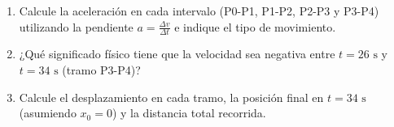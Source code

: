 \documentclass[11pt, letterpaper]{article}
\newif\ifmostrarrespuestas
\newcommand{\respuesta}[1]{
	\ifmostrarrespuestas
	\par\vspace{0.2cm}
	\begin{tcolorbox}[colback=blue!5!white, colframe=valblue, coltext=blue!80!black, boxrule=0.5pt, arc=1mm, left=2mm, right=2mm, top=1.5mm, bottom=1.5mm]
		\footnotesize \textbf{\textcolor{valblue}{Solución Paso a Paso (Docente):}} #1
	\end{tcolorbox}
	\vspace{0.2cm}
	\fi
}
\begin{document}
\begin{enumerate}[leftmargin=*, itemsep=0.6cm]
		\begin{enumerate}[label=\alph*., itemsep=0.2cm]
			\item Calcule la aceleración en cada intervalo (P0-P1, P1-P2, P2-P3 y P3-P4) utilizando la pendiente $a = \frac{\Delta v}{\Delta t}$ e indique el tipo de movimiento.
			\item ¿Qué significado físico tiene que la velocidad sea negativa entre $t = 26\text{ s}$ y $t = 34\text{ s}$ (tramo P3-P4)?
			\item Calcule el desplazamiento en cada tramo, la posición final en $t = 34\text{ s}$ (asumiendo $x_0 = 0$) y la distancia total recorrida.
		\end{enumerate}
		\respuesta{
			\textbf{a)} \textbf{P0-P1 ($0-8\text{ s}$):} $a_{01} = \frac{35-15}{8-0} = \mathbf{2,5}\text{ \textbf{m/s}}^\mathbf{2}$ ($\text{MUA}+$); \quad 
			\textbf{P1-P2 ($8-20\text{ s}$):} $a_{12} = \frac{35-35}{12} = \mathbf{0}\text{ \textbf{m/s}}^\mathbf{2}$ ($\text{MU}$);\\
			\textbf{P2-P3 ($20-26\text{ s}$):} $a_{23} = \frac{0-35}{6} \approx \mathbf{-5,83}\text{ \textbf{m/s}}^\mathbf{2}$ ($\text{MUA}-$); \quad 
			\textbf{P3-P4 ($26-34\text{ s}$):} $a_{34} = \frac{-20-0}{8} = \mathbf{-2,5}\text{ \textbf{m/s}}^\mathbf{2}$ ($\text{MUA}$ reversa).\\[0.1cm]
			\textbf{b)} En $t = 26\text{ s}$ se detiene e invierte su sentido de movimiento, desplazándose hacia la izquierda / en contra del sentido positivo de referencia.\\[0.1cm]
			\textbf{c)} Desplazamientos: $x_{01} = \frac{15+35}{2}(8) = \mathbf{200}\text{ \textbf{m}}$; \quad $x_{12} = 35(12) = \mathbf{420}\text{ \textbf{m}}$; \quad $x_{23} = \frac{35(6)}{2} = \mathbf{105}\text{ \textbf{m}}$; \quad $\Delta x_{34} = \frac{-20(8)}{2} = \mathbf{-80}\text{ \textbf{m}}$.\\
			\textbf{Posición final:} $x_f = 200 + 420 + 105 - 80 = \mathbf{645}\text{ \textbf{m}}$. \quad \textbf{Distancia total:} $d = 200 + 420 + 105 + |-80| = \mathbf{805}\text{ \textbf{m}}$.
		}
		

\end{enumerate}
\end{document}
